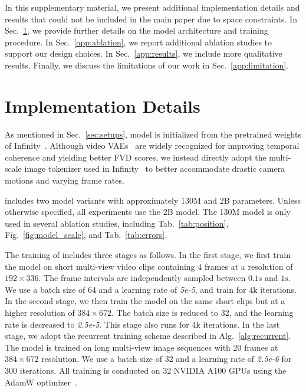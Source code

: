 In this supplementary material, we present additional implementation details and results that could not be included in the main paper due to space constraints. In Sec.~\ref{app:implementation}, we provide further details on the model architecture and training procedure. In Sec.~\ref{app:ablation}, we report additional ablation studies to support our design choices. In Sec.~\ref{app:results}, we include more qualitative results. Finally, we discuss the limitations of our work in Sec.~\ref{app:limitation}.

\section{Implementation Details}
\label{app:implementation}
As mentioned in Sec.~\ref{sec:setups}, \ourmethod{} model is initialized from the pretrained weights of Infinity~\cite{han2024infinity}.  Although video VAEs~\cite{openai2024sora,yang2025cogvideoxtexttovideodiffusionmodels} are widely recognized for improving temporal coherence and yielding better FVD scores, we instead directly adopt the multi-scale image tokenizer used in Infinity~\cite{han2024infinity} to better accommodate drastic camera motions and varying frame rates. 

\ourmethod{} includes two model variants with approximately 130M and 2B parameters. Unless otherwise specified, all experiments use the 2B model. The 130M model is only used in several ablation studies, including Tab.~\ref{tab:position}, Fig.~\ref{fig:model_scale}, and Tab.~\ref{tab:errors}.

The training of \ourmethod{} includes three stages as follows. In the first stage, we first train the model on short multi-view video clips containing 4 frames at a resolution of $192\times336$. The frame intervals are independently sampled between $0.1\text{s}$ and $1\text{s}$. We use a batch size of 64 and a learning rate of \textit{5e-5}, and train for $4\text{k}$ iterations. In the second stage, we then train the model on the same short clips but at a higher resolution of $384\times672$. The batch size is reduced to 32, and the learning rate is decreased to \textit{2.5e-5}. This stage also runs for $4\text{k}$ iterations. In the last stage, we adopt the recurrent training scheme described in Alg.~\ref{alg:recurrent}. The model is trained on long multi-view image sequences with 20 frames at $384\times672$ resolution. We use a batch size of 32 and a learning rate of \textit{2.5e-6} for 300 iterations. All training is conducted on 32 NVIDIA A100 GPUs using the AdamW optimizer~\cite{loshchilov2017decoupled}.



